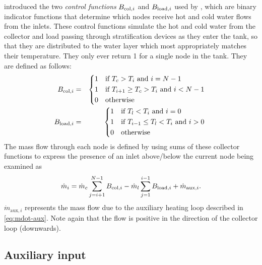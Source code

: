  introduced the two \emph{control functions} $B_{\text{col}, i}$ and $B_{\text{load}, i}$ used by , which are binary indicator functions that determine which nodes receive hot and cold water flows from the inlets.
These control functions simulate the hot and cold water from the collector and load passing through stratification devices as they enter the tank, so that they are distributed to the water layer which most appropriately matches their temperature.
They only ever return 1 for a single node in the tank.
They are defined as follows:
\begin{eqnarray}
   \label{eq:B-col}
   \B{col} &=& \begin{dcases*}
      1 & if $T_c > T_i$ and $i = N-1$ \\
      1 & if $T_{i+1} \ge T_c > T_i$ and $i < N-1$ \\
      0 & otherwise
   \end{dcases*}
   \\
   \label{eq:B-load}
   \B{load} &=& \begin{dcases*}
      1 & if $T_l < T_i$ and $i = 0$ \\
      1 & if $T_{i-1} \le T_l < T_i$ and $i > 0$ \\
      0 & otherwise
   \end{dcases*}
\end{eqnarray}
The mass flow through each node is defined by  using sums of these collector functions to express the presence of an inlet above/below the current node being examined as
\begin{equation}
	\label{eq:mdot}
   \dot{m}_i = \dot{m}_c \sum_{j=i+1}^{N-1} B_{\text{col}, i}
             - \dot{m}_l \sum_{j=1}^{i-1} B_{\text{load}, i}
             + \dot{m}_{\text{aux}, i}.
\end{equation}
$\dot{m}_{\text{aux}, i}$ represents the mass flow due to the auxiliary heating loop described in \autoref{eq:mdot-aux}.
Note again that the flow is positive in the direction of the collector loop (downwards).

\subsection{Auxiliary input}

